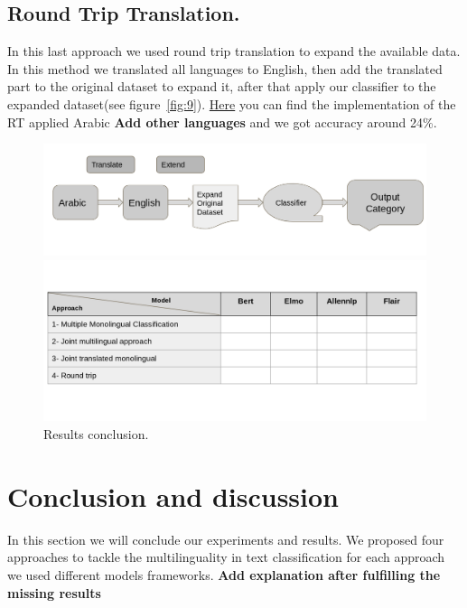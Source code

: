 \documentclass[letterpaper,12pt]{article}
\begin{document}
\subsection{Round Trip Translation.}
In this last approach we used round trip translation to expand the available data. In this method we translated all languages to English, then add the translated part to the original dataset to expand it, after that apply our classifier to the expanded dataset(see figure~\ref{fig:9}). \href{https://github.com/nesmaAlmoazamy/Handling_Multilinguality/blob/master/AllenNlp_SingleClassifier_All_RoundTrip.ipynb}{Here} you can find the implementation of the RT applied Arabic \textbf{Add other languages} and we got accuracy around 24\%.




\begin{figure}
	\centering
	\begin{minipage}[b]{.4\textwidth}
		\centering \includegraphics[width=0.8\columnwidth]{5.png}
		
		\caption{
			\label{fig:9} %
			Round Trip Approach
		}
		
	\end{minipage}\qquad
	\begin{minipage}[b]{.4\textwidth}
		
		\centering \includegraphics[width=0.8\columnwidth]{6.png}
		
		\caption{
			\label{fig:10} %
			Results conclusion.
		}
		
	\end{minipage}
\end{figure}


\section{Conclusion and discussion}
In this section we will conclude our experiments and results. We proposed four approaches to tackle the multilinguality in text classification for each approach we used different models frameworks. \textbf{Add explanation after fulfilling the missing results}
\end{document}
